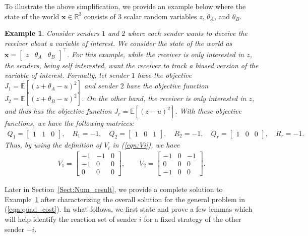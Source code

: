 \documentclass[12pt,journal,onecolumn]{IEEEtran}
\newtheorem{example}{Example}
\newcommand{\rknote}[1]{\noindent{\leavevmode\color{red}[Raj -- #1]}}
\begin{document}
To illustrate the above simplification, we provide an example below where the state of the world $\boldsymbol{x}\in \mathbb{R}^3$ consists of 3 scalar random variables $z$, $\theta_A$, and $\theta_B$. %
\begin{example}\label{ex1}
Consider senders $1$ and $2$ where each sender wants to deceive the receiver about a variable of interest. We consider the state of the world as $\boldsymbol{x}=\begin{bmatrix}z & \theta_A &\theta_B\end{bmatrix}^\top$. For this example, while the receiver is only interested in $z$, the senders, being self interested, want the receiver to track a biased version of the variable of interest. Formally, 
let sender $1$ have the objective $J_{1}=\mathbb{E}[(z+\theta_A-u)^2]$ and sender $2$ have the objective function $J_{2}=\mathbb{E}[(z+\theta_B-u)^2]$. On the other hand, the receiver is only interested in $z$, and thus has the objective function  $J_{r} = \mathbb{E}[(z-u)^2]$. With these objective functions, we have the following matrices:
\begin{align*}
    Q_1=\begin{bmatrix}1 &1 &0\end{bmatrix},\quad R_1=-1,\quad Q_2=\begin{bmatrix}1 &0 &1\end{bmatrix},\quad R_2=-1,\quad Q_r=\begin{bmatrix}1 &0 &0\end{bmatrix},\quad R_r=-1.
\end{align*}
Thus, by using the definition of $V_i$ in (\ref{eqn:Vi}), we have%
\begin{align*}
    V_1=\begin{bmatrix}-1 & -1 &0\\-1 & 0 &0\\0 &0 &0\end{bmatrix},\qquad V_2=\begin{bmatrix}-1 &0 &-1\\0 &0 &0\\-1 &0 &0\end{bmatrix}.
\end{align*}
\end{example}
Later in Section~\ref{Sect:Num_result}, we provide a complete solution to Example~\ref{ex1} after characterizing the overall solution for the general problem in (\ref{eqn:quad_cost}). In what follows, we first state and prove a few lemmas which will help identify the reaction set of sender $i$ for a fixed strategy of the other sender $-i$. %
\end{document}
